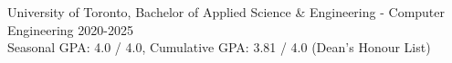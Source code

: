 University of Toronto, Bachelor of Applied Science \& Engineering - Computer Engineering \hfill{2020-2025}
\\ Seasonal GPA: 4.0 / 4.0, Cumulative GPA: 3.81 / 4.0 (Dean’s Honour List)